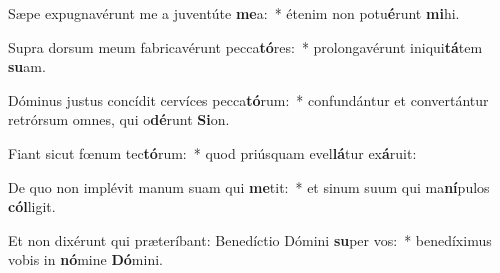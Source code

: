 \item Sæpe expugnavérunt me a juventúte \textbf{me}a:~* étenim non potu\textbf{é}runt \textbf{mi}hi.
\item Supra dorsum meum fabricavérunt pecca\textbf{tó}res:~* prolongavérunt iniqui\textbf{tá}tem \textbf{su}am.
\item Dóminus justus concídit cervíces pecca\textbf{tó}rum:~* confundántur et convertántur retrórsum omnes, qui o\textbf{dé}runt \textbf{Si}on.
\item Fiant sicut fœnum tec\textbf{tó}rum:~* quod priúsquam evel\textbf{lá}tur ex\textbf{á}ruit:
\item De quo non implévit manum suam qui \textbf{me}tit:~* et sinum suum qui ma\textbf{ní}pulos \textbf{cól}ligit.
\item Et non dixérunt qui præteríbant: Benedíctio Dómini \textbf{su}per vos:~* benedíximus vobis in \textbf{nó}mine \textbf{Dó}mini.
